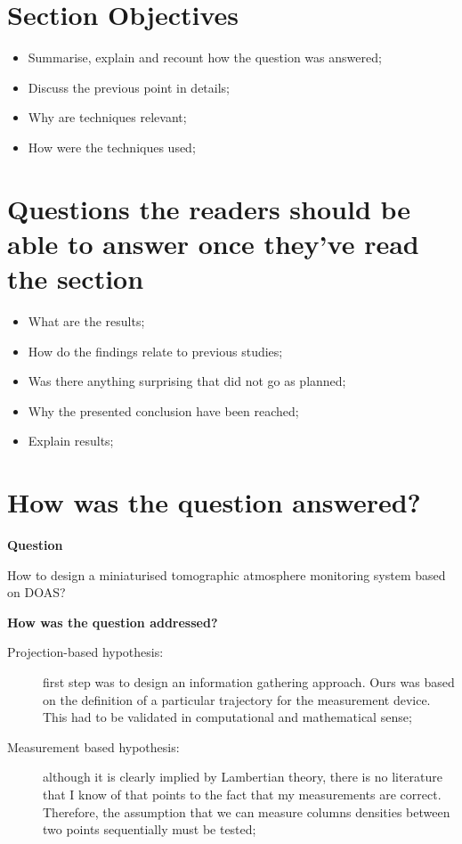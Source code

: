 \section{Section Objectives}%
\label{sec:section_objectives}

\begin{itemize}
    \item Summarise, explain and recount how the question was answered;
    \item Discuss the previous point in details;
    \item Why are techniques relevant;
    \item How were the techniques used;
\end{itemize}

\section{Questions the readers should be able to answer once they've
read the section}%
\label{sec:questions_the_readers_should_be_able_to_answer_once_they_ve_read_the_section}
\begin{itemize}
    \item What are the results;
    \item How do the findings relate to previous studies;
    \item Was there anything surprising that did not go as planned;
    \item Why the presented conclusion have been reached;
    \item Explain results;
\end{itemize}


\section{How was the question answered?}%
\label{sec:how_was_the_question_answered_}
\textbf{Question}

How to design a miniaturised tomographic atmosphere monitoring system
based on DOAS?

\textbf{How was the question addressed?}

\begin{description}
    \item[Projection-based hypothesis:]first step was to design an
        information gathering approach. Ours was based on the definition
        of a particular trajectory for the measurement device. This had
        to be validated in computational and mathematical sense;
    \item[Measurement based hypothesis:] although it is clearly implied
        by Lambertian theory, there is no literature that I know of that
        points to the fact that my measurements are correct. Therefore,
        the assumption that we can measure columns densities between two
        points sequentially must be tested;
\end{description}

